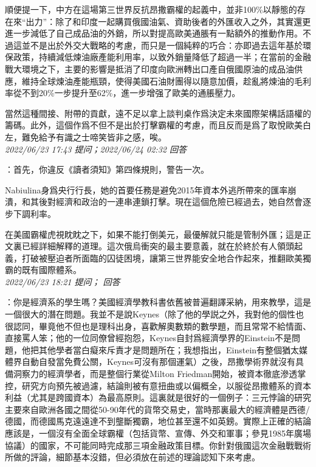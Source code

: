 \documentclass[twocolumn]{ctexart}
\begin{document}
順便提一下，中方在這場第三世界反抗昂撒霸權的起義中，並非100\%以靜態的存在來“出力”：除了和印度一起購買俄國油氣、資助後者的外匯收入之外，其實還更進一步減低了自己成品油的外銷，所以對提高歐美通脹有一點額外的推動作用。不過這並不是出於外交大戰略的考慮，而只是一個純粹的巧合：亦即過去這年基於環保政策，持續減低煉油廠產能利用率，以致外銷量降低了超過一半；在當前的金融戰大環境之下，主要的影響是抵消了印度向歐洲轉出口產自俄國原油的成品油供應，維持全球煉油產能瓶頸，使得美國石油財團得以隨意加價，趁亂將煉油的毛利率從不到20\%一步提升至62\%，進一步增强了歐美的通脹壓力。

當然這種間接、附帶的貢獻，遠不足以拿上談判桌作爲決定未來國際架構話語權的籌碼。此外，這個作爲不但不是出於打擊霸權的考慮，而且反而是爲了取悅歐美白左，難免給予有識之士啼笑皆非之感，唉。
\\

\textit{\hfill\noindent\small 2022/06/23 17:43 提问；2022/06/24 02:32 回答}

：首先，你違反《讀者須知》第四條規則，警告一次。

Nabiulina身爲央行行長，她的首要任務是避免2015年資本外逃所帶來的匯率崩潰，和其後對經濟和政治的一連串連鎖打擊。現在這個危險已經過去，她自然會逐步下調利率。

在美國霸權虎視眈眈之下，如果不能打倒美元，最優解就只能是管制外匯；這是正文裏已經詳細解釋的道理。這次俄烏衝突的最主要意義，就在於終於有人領頭起義，打破被壓迫者所面臨的囚徒困境，讓第三世界能安全地合作起來，推翻歐美獨霸的既有國際體系。
\\

\textit{\hfill\noindent\small 2022/06/23 18:21 提问； 回答}

：你是經濟系的學生嗎？美國經濟學教科書依舊被普遍翻譯采納，用來教學，這是一個很大的潛在問題。我並不是說Keynes（除了他的學説之外，我對他的個性也很認同，畢竟他不但也是理科出身，喜歡解奧數類的數學題，而且常常不給情面、直接罵人笨；他的一位同僚曾經抱怨，Keynes自封爲經濟學界的Einstein不是問題，他把其他學者當白癡來斥責才是問題所在；我想指出，Einstein有整個猶太媒體界自動自發當免費公關，Keynes可沒有那個運氣）之後，昂撒學術界就沒有具備洞察力的經濟學者，而是整個行業從Milton Friedman開始，被資本徹底滲透掌控，研究方向預先被過濾，結論則被有意扭曲或以偏概全，以服從昂撒體系的資本利益（尤其是跨國資本）為最高原則。這裏就是很好的一個例子：三元悖論的研究主要來自歐洲各國之間從50-90年代的貨幣交易史，當時那裏最大的經濟體是西德/德國，而德國馬克遠遠達不到壟斷獨霸，地位甚至還不如英鎊。實際上正確的結論應該是，一個沒有全面全球霸權（包括貨幣、宣傳、外交和軍事；參見1985年廣場協議）的國家，不可能同時完成那三項金融政策目標。你針對俄國這次金融戰戰術所做的評論，細節基本沒錯，但必須放在前述的理論認知下來考慮。\\
\end{document}
